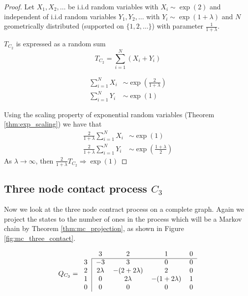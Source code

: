 \documentclass{article}
\theoremstyle{plain}
\theoremstyle{definition}
\theoremstyle{remark}
\numberwithin{equation}{section}
\begin{document}
\begin{proof}
Let $X_1, X_2, \ldots$ be i.i.d random variables with
$X_i \sim \exp(2)$ and independent of i.i.d random variables $Y_1, Y_2, \ldots$ with  $Y_i \sim \exp(1 + \lambda)$ and
$N$ geometrically distributed (supported on $\{1,2,\ldots\}$) with parameter $\frac{1}{1 + \lambda}$.

$T_{C_2}$ is expressed as a random sum
$$
T_{C_2} = \sum_{i = 1}^N (X_i + Y_i)
$$

\begin{align*}
    \sum_{i = 1}^N X_i &\sim \exp\left( \frac{2}{1 + \lambda} \right)\\
    \sum_{i = 1}^N Y_i &\sim \exp( 1 )
\end{align*}

Using the scaling property of exponential random variables (Theorem \ref{thm:exp_scaling}) we have that
\begin{align*}
    \frac{2}{1 + \lambda}\sum_{i = 1}^N X_i &\sim \exp( 1 )\\
    \frac{2}{1 + \lambda}\sum_{i = 1}^N Y_i &\sim \exp \left( \frac{1 + \lambda}{2} \right)
\end{align*}
As $\lambda \to \infty$, then $\frac{2}{1 + \lambda} T_{C_2} \Rightarrow \exp(1)$
\end{proof}


\subsection{Three node contact process \texorpdfstring{$C_3$}{C3}}
Now we look at the three node contract process on a complete graph.
Again we project the states to the number of ones in the process which will be a Markov chain by Theorem \ref{thm:mc_projection}, as shown in Figure \ref{fig:mc_three_contact}.

\begin{equation}
Q_{C_3} = \begin{blockarray}{ccccc}
    & 3 & 2 & 1 & 0\\
    \begin{block}{c|cccc}
    \cline{2-5}
        3 & -3 & 3 & 0 & 0 \\
        2 & 2\lambda & -(2 + 2 \lambda) &
        2 & 0\\
        1 & 0 & 2\lambda & -(1 + 2\lambda) & 1\\
    0 & 0 & 0 & 0 & 0\\
    \end{block}
\end{blockarray}
\end{equation}
\end{document}
